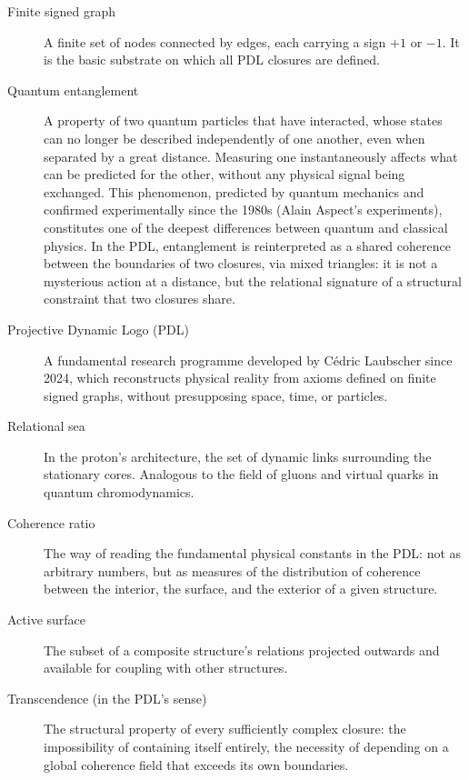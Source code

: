 \documentclass[12pt, a4paper, openright]{book}
\begin{document}
\begin{description}
\item[Finite signed graph] A finite set of nodes connected by edges, each carrying a sign $+1$ or $-1$. It is the basic substrate on which all PDL closures are defined.

\item[Quantum entanglement] A property of two quantum particles that have interacted, whose states can no longer be described independently of one another, even when separated by a great distance. Measuring one instantaneously affects what can be predicted for the other, without any physical signal being exchanged. This phenomenon, predicted by quantum mechanics and confirmed experimentally since the 1980s (Alain Aspect's experiments), constitutes one of the deepest differences between quantum and classical physics. In the PDL, entanglement is reinterpreted as a shared coherence between the boundaries of two closures, via mixed triangles: it is not a mysterious action at a distance, but the relational signature of a structural constraint that two closures share.

\item[Projective Dynamic Logo (PDL)] A fundamental research programme developed by Cédric Laubscher since 2024, which reconstructs physical reality from axioms defined on finite signed graphs, without presupposing space, time, or particles.

\item[Relational sea] In the proton's architecture, the set of dynamic links surrounding the stationary cores. Analogous to the field of gluons and virtual quarks in quantum chromodynamics.

\item[Coherence ratio] The way of reading the fundamental physical constants in the PDL: not as arbitrary numbers, but as measures of the distribution of coherence between the interior, the surface, and the exterior of a given structure.

\item[Active surface] The subset of a composite structure's relations projected outwards and available for coupling with other structures.

\item[Transcendence (in the PDL's sense)] The structural property of every sufficiently complex closure: the impossibility of containing itself entirely, the necessity of depending on a global coherence field that exceeds its own boundaries.

\end{description}
\end{document}
